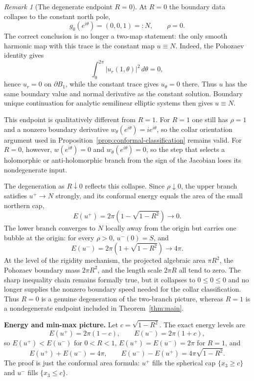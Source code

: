 \documentclass[11pt]{amsart}
\numberwithin{equation}{section}
\theoremstyle{remark}
\newtheorem*{remark}{Remark}
\begin{document}
\begin{remark}[The degenerate endpoint $R=0$]
At $R=0$ the boundary data collapse to the constant north pole,
\[
g_0(e^{i\theta})=(0,0,1)=:N,
\qquad \rho=0.
\]
The correct conclusion is no longer a two-map statement: the only smooth harmonic map with this trace is the constant map $u\equiv N$. Indeed,
the Pohozaev identity gives
\[
\int_0^{2\pi}|u_r(1,\theta)|^2\, d\theta=0,
\]
hence $u_r=0$ on $\partial B_1$, while the constant trace gives $u_\theta=0$ there. Thus $u$ has the same boundary value and normal derivative
as the constant solution. Boundary unique continuation for analytic semilinear elliptic systems then gives $u\equiv N$.

This endpoint is qualitatively different from $R=1$. For $R=1$ one still has $\rho=1$ and a nonzero boundary derivative
$w_\theta(e^{i\theta})=ie^{i\theta}$, so the collar orientation argument used in Proposition~\ref{prop:conformal-classification} remains
valid. For $R=0$, however, $w(e^{i\theta})=0$ and $w_\theta(e^{i\theta})=0$, so the step that selects a holomorphic or anti-holomorphic branch
from the sign of the Jacobian loses its nondegenerate input.

The degeneration as $R\downarrow0$ reflects this collapse. Since $\rho\downarrow0$, the upper branch satisfies $u^+\to N$ strongly, and its
conformal energy equals the area of the small northern cap,
\[
E(u^+)=2\pi(1-\sqrt{1-R^2})\to0.
\]
The lower branch converges to $N$ locally away from the origin but carries one bubble at the origin: for every $\rho>0$, $u^-(0)=S$, and
\[
E(u^-)=2\pi(1+\sqrt{1-R^2})\to4\pi.
\]
At the level of the rigidity mechanism, the projected algebraic area $\pi R^2$, the Pohozaev boundary mass $2\pi R^2$, and the length scale
$2\pi R$ all tend to zero. The sharp inequality chain remains formally true, but it collapses to $0\le0\le0$ and no longer supplies the
nonzero boundary speed needed for the collar classification. Thus $R=0$ is a genuine degeneration of the two-branch picture, whereas $R=1$ is
a nondegenerate endpoint included in Theorem~\ref{thm:main}.
\end{remark}




\medskip
\noindent\textbf{Energy and min-max picture.}
Let $c=\sqrt{1-R^2}$. The exact energy levels are
\[
 E(u^+)=2\pi(1-c),\qquad E(u^-)=2\pi(1+c),
\]
so $E(u^+)<E(u^-)$ for $0<R<1$, $E(u^+)=E(u^-)=2\pi$ for $R=1$, and
\[
 E(u^+)+E(u^-)=4\pi,
 \qquad
 E(u^-)-E(u^+)=4\pi\sqrt{1-R^2}.
\]
The proof is just the conformal area formula: $u^+$ fills the spherical cap $\{x_3\ge c\}$ and $u^-$ fills $\{x_3\le c\}$.
\end{document}
